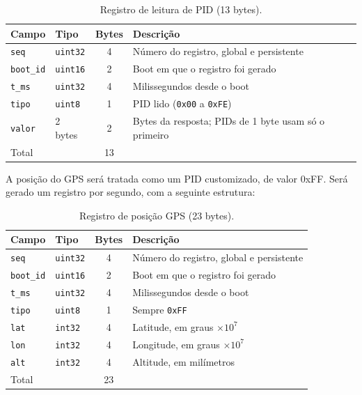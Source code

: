 \documentclass[12pt]{article}
\begin{document}
\begin{table}[htbp]
  \centering
  \caption{Registro de leitura de PID (13 bytes).}
  \label{tab:reg-leitura}
  \begin{tabular}{llcl}
    \toprule
    Campo & Tipo & Bytes & Descrição \\
    \midrule
    \texttt{seq}     & \texttt{uint32} & 4 & Número do registro, global e persistente \\
    \texttt{boot\_id} & \texttt{uint16} & 2 & Boot em que o registro foi gerado \\
    \texttt{t\_ms}   & \texttt{uint32} & 4 & Milissegundos desde o boot \\
    \texttt{tipo}    & \texttt{uint8}  & 1 & PID lido (\texttt{0x00} a \texttt{0xFE}) \\
    \texttt{valor}   & 2 bytes         & 2 & Bytes da resposta; PIDs de 1 byte usam só o primeiro \\
    \midrule
    Total & & 13 & \\
    \bottomrule
  \end{tabular}
\end{table}

A posição do GPS será tratada como um PID customizado, de valor 0xFF. Será gerado um registro por segundo, com a seguinte estrutura:

\begin{table}[htbp]
  \centering
  \caption{Registro de posição GPS (23 bytes).}
  \label{tab:reg-gps}
  \begin{tabular}{llcl}
    \toprule
    Campo & Tipo & Bytes & Descrição \\
    \midrule
    \texttt{seq}     & \texttt{uint32} & 4 & Número do registro, global e persistente \\
    \texttt{boot\_id} & \texttt{uint16} & 2 & Boot em que o registro foi gerado \\
    \texttt{t\_ms}   & \texttt{uint32} & 4 & Milissegundos desde o boot \\
    \texttt{tipo}    & \texttt{uint8}  & 1 & Sempre \texttt{0xFF} \\
    \texttt{lat}     & \texttt{int32}  & 4 & Latitude, em graus $\times 10^7$ \\
    \texttt{lon}     & \texttt{int32}  & 4 & Longitude, em graus $\times 10^7$ \\
    \texttt{alt}     & \texttt{int32}  & 4 & Altitude, em milímetros \\
    \midrule
    Total & & 23 & \\
    \bottomrule
  \end{tabular}
\end{table}
\end{document}
